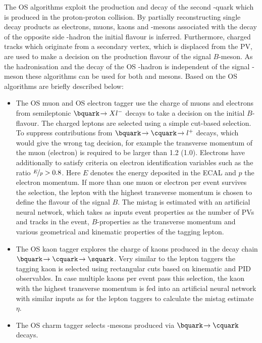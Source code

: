 The OS algorithms exploit the production and decay of the second \bquark-quark which is produced in the proton-proton collision.
By partially reconstructing single decay products as electrons, muons, kaons and \D-mesons associated with the decay of the opposite side \bquark-hadron the initial flavour is inferred.
Furthermore, charged tracks which originate from a secondary vertex, which is displaced from the \ac{PV}, are used to make a decision on the production flavour of the signal $B$-meson.
As the hadronisation and the decay of the OS \bquark-hadron is independent of the signal \B-meson these algorithms can be used for both \Bz and \Bs mesons. Based on \cite{LHCb-PAPER-2011-027, LHCb-PAPER-2015-027} the OS algorithms are briefly described below:
\begin{itemize}
	\item The OS muon and OS electron tagger use the charge of muons and electrons from semileptonic $\bquark\!\to Xl^-$ decays to take a decision on the initial $B$-flavour.
	The charged leptons are selected using a simple cut-based selection.
	To suppress contributions from $\bquark\!\to\cquark\!\to l^+$ decays, which would give the wrong tag decision, for example the transverse momentum of the muon (electron) is required to be larger than \SI[per-mode=symbol]{1.2}{\GeVc} (\SI[per-mode=symbol]{1.0}{\GeVc}).
	Electrons have additionally to satisfy criteria on electron identification variables such as the ratio $\nicefrac{E}{p}>0.8$.
	Here $E$ denotes the energy deposited in the ECAL and $p$ the electron momentum.
	If more than one muon or electron per event survives the selection, the lepton with the highest transverse momentum is chosen to define the flavour of the signal $B$.
	The mistag is estimated with an artificial neural network, which takes as inputs event properties as the number of \ac{PV}s and tracks in the event, $B$-properties as the transverse momentum and various geometrical and kinematic properties of the tagging lepton.
	\item The OS kaon tagger explores the charge of kaons produced in the decay chain $\bquark\!\to\cquark\!\to\squark$.
	Very similar to the lepton taggers the tagging kaon is selected using rectangular cuts based on kinematic and PID observables.
	In case multiple kaons per event pass this selection, the kaon with the highest transverse momentum is fed into an artificial neural network with similar inputs as for the lepton taggers to calculate the mistag estimate $\eta$.
	\item The OS charm tagger selects \D-mesons produced via $\bquark\!\to\cquark$ decays.

\end{itemize}
